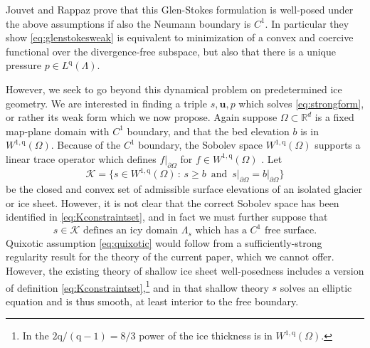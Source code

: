 \documentclass[letterpaper,final,12pt,reqno]{amsart}
\theoremstyle{claim}
\newcommand{\RR}{\mathbb{R}}
\newcommand{\bu}{\mathbf{u}}
\newcommand{\qq}{{\text{q}}}
\numberwithin{equation}{section}
\numberwithin{figure}{section}
\numberwithin{table}{section}
\numberwithin{theorem}{section}
\begin{document}
Jouvet and Rappaz \cite{JouvetRappaz2011} prove that this Glen-Stokes formulation is well-posed under the above assumptions if also the Neumann boundary is $C^1$.  In particular they show \eqref{eq:glenstokesweak} is equivalent to minimization of a convex and coercive functional over the divergence-free subspace, but also that there is a unique pressure $p\in L^\qq(\Lambda)$.

However, we seek to go beyond this dynamical problem on predetermined ice geometry.  We are interested in finding a triple $s,\bu,p$ which solves \eqref{eq:strongform}, or rather its weak form which we now propose.  Again suppose $\Omega \subset \RR^d$ is a fixed map-plane domain with $C^1$ boundary, and that the bed elevation $b$ is in $W^{1,\qq}(\Omega)$.  Because of the $C^1$ boundary, the Sobolev space $W^{1,\qq}(\Omega)$ supports a linear trace operator which defines $f|_{\partial \Omega}$ for $f \in W^{1,\qq}(\Omega)$ \cite[Section 5.5]{Evans2010}.  Let
\begin{equation}
\mathcal{K} = \{s \in W^{1,\qq}(\Omega) \,:\, s \ge b \, \text{ and } \, s\big|_{\partial\Omega} = b\big|_{\partial\Omega}\}  \label{eq:Kconstraintset}
\end{equation}
be the closed and convex set of admissible surface elevations of an isolated glacier or ice sheet.  However, it is not clear that the correct Sobolev space has been identified in \eqref{eq:Kconstraintset}, and in fact we must further suppose that
\begin{equation}
s\in \mathcal{K} \text{ defines an icy domain } \Lambda_s \text{ which has a $C^1$ free surface.} \label{eq:quixotic}
\end{equation}
Quixotic assumption \eqref{eq:quixotic} would follow from a sufficiently-strong regularity result for the theory of the current paper, which we cannot offer.  However, the existing theory of shallow ice sheet well-posedness \cite{JouvetBueler2012} includes a version of definition \eqref{eq:Kconstraintset},\footnote{In \cite{JouvetBueler2012} the $2\qq/(\qq-1)=8/3$ power of the ice thickness is in $W^{1,\qq}(\Omega)$.} and in that shallow theory $s$ solves an elliptic equation and is thus smooth, at least interior to the free boundary.
\end{document}
